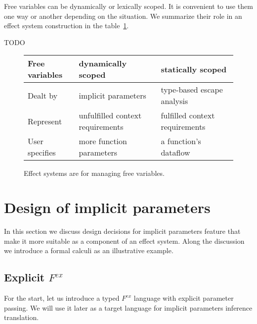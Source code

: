 \documentclass[acmsmall]{acmart}
\begin{document}
Free variables can be dynamically or lexically scoped.
It is convenient to use them one way or another depending on the situation.
We summarize their role in an effect system construction in the table~\ref{fig:free-vars}.

TODO %

\begin{figure}
    \centering
    \begin{tabular}{|l|l|l|}
        \hline
        Free variables & dynamically scoped & statically scoped \\
        \hline
        Dealt by & implicit parameters & type-based escape analysis \\
        Represent & unfulfilled context requirements & fulfilled context requirements \\
        User specifies & more function parameters & a function’s dataflow \\
        \hline
    \end{tabular}
    \caption{Effect systems are for managing free variables.}
    \label{fig:free-vars}
\end{figure}

\clearpage


\section{Design of implicit parameters} \label{sec:implicits}

In this section we discuss design decisions for implicit parameters feature that make it more suitable as a component of an effect system.
Along the discussion we introduce a formal calculi as an illustrative example.

\subsection{Explicit $F^{ex}$} \label{subsec:core-lang}

For the start, let us introduce a typed $F^{ex}$ language with explicit parameter passing.
We will use it later as a target language for implicit parameters inference translation.
\end{document}
